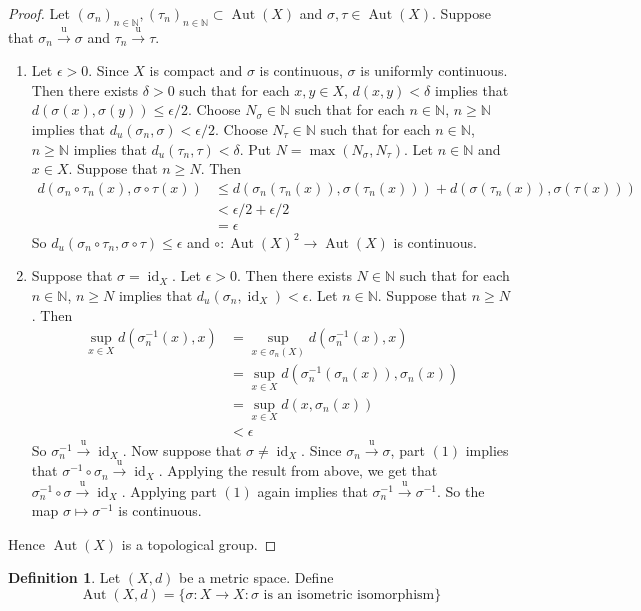 \documentclass[12pt]{amsart}
\theoremstyle{definition}
\newtheorem{defn}[definition]{Definition}
\newcommand{\del}{\delta}
\newcommand{\ep}{\epsilon}
\newcommand{\sig}{\sigma}
\newcommand{\N}{\mathbb{N}}
\newcommand{\convt}[1]{\xrightarrow{\text{#1}}}
\DeclareMathOperator{\id}{id}
\DeclareMathOperator{\Aut}{Aut}
\newcommand{\ld}[1]{\label{defn:#1}}
\begin{document}
	\begin{proof}
	Let $(\sig_n)_{n \in \N}, (\tau_n)_{n \in \N} \subset \Aut(X)$ and $\sig,\tau \in \Aut(X)$. Suppose that $\sig_n \convt{u} \sig$ and $\tau_n \convt{u} \tau$.
	\begin{enumerate}
	\item Let $\ep >0$. Since $X$ is compact and $\sig$ is continuous, $\sig$ is uniformly continuous. Then there exists $\del >0$ such that for each $x, y \in X$, $d(x,y) < \del$ implies that $d(\sig(x), \sig(y)) \leq \ep/2$.  Choose $N_\sig \in \N$ such that for each $n \in \N$, $ n \geq \N$ implies that $d_u(\sig_n, \sig) < \ep/2$. Choose $N_\tau \in \N$ such that for each $n \in \N$, $ n \geq \N$ implies that $d_u(\tau_n, \tau) < \del$. Put $N = \max(N_\sig, N_\tau)$. Let $n \in \N$ and $x \in X$. Suppose that $n \geq N$. Then 
	\begin{align*}
		d(\sig_n \circ \tau_n (x) ,\sig \circ \tau (x) ) 
		&\leq  d(\sig_n(\tau_n(x)),  \sig(\tau_n(x))) + d( \sig(\tau_n (x)), \sig( \tau (x))) \\
		& < \ep / 2 +\ep / 2 \\
		&= \ep 
	\end{align*}
	So $d_u(\sig_n \circ \tau_n, \sig\circ \tau) \leq \ep$ and $\circ: \Aut(X)^2 \rightarrow \Aut(X)$ is continuous. 
	\item Suppose that $\sig = \id_X$. Let $\ep >0$. Then there exists $N \in \N$ such that for each $n \in \N$, $n \geq N$ implies that $d_u(\sig_n, \id_X) < \ep$. Let $n \in \N$. Suppose that $n \geq N$. Then 
	\begin{align*}
	\sup_{x \in X} d(\sig^{-1}_n(x), x) 
	&= \sup_{x \in \sig_n(X)}d(\sig^{-1}_n(x), x) \\
	&= \sup_{x \in X}d(\sig^{-1}_n(\sig_n(x)), \sig_n(x)) \\
	&= \sup_{x \in X}d(x, \sig_n(x)) \\
	&< \ep
	\end{align*}
	So $\sig^{-1}_n \convt{u} \id_X$. Now suppose that $\sig \neq \id_X$. Since $\sig_n \convt{u} \sig$, part $(1)$ implies that $\sig^{-1} \circ \sig_n \convt{u} \id_X$. Applying the result from above, we get that $\sig_n^{-1} \circ \sig \convt{u} \id_X$. Applying part $(1)$ again implies that $\sig_n^{-1}  \convt{u}  \sig^{-1}$. So the map $\sig \mapsto \sig^{-1}$ is continuous. 
	\end{enumerate}
	Hence $\Aut(X)$ is a topological group. 
	\end{proof}
	
	\begin{defn} \ld{}
	Let $(X, d)$ be a metric space. Define 
	$$\Aut(X, d) = \{\sig:X\rightarrow X: \sig \text{ is an isometric isomorphism} \}$$  
	\end{defn}
	
\end{document}
